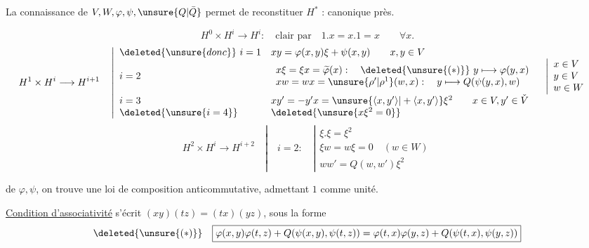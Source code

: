 La connaissance de $V,W,\varphi,\psi,\unsure{Q|\bar Q}$ permet de reconstituer $H^*$ :
 canonique près.

\[
H^0\times H^i\longrightarrow H^i:\quad\text{clair par}\quad
1.x=x.1=x\qquad\forall x.
\]
\[
H^1\times H^i\longrightarrow H^{i+1}\quad
\left|\begin{array}{ll}
\deleted{\unsure{donc}}\ i=1&xy=\varphi(x,y)\xi+\psi(x,y)\qquad x,y\in V\\
i=2&\begin{array}{l}
x\xi=\xi x=\widetilde\varphi(x):\quad\deleted{\unsure{(*)}}\ y\longmapsto\varphi(y,x)\\
xw=wx=\unsure{\rho'|\rho^1}(w,x):\quad y\longmapsto Q(\psi(y,x),w)
\end{array}\quad\left|\begin{array}{l}x\in V\\y\in V\\w\in W\end{array}\right.\\
i=3&xy'=-y'x=\unsure{\langle x,y'\rangle|+\langle x,y'\rangle}\xi^2\qquad x\in V,y'\in\check V\\
\deleted{\unsure{i=4}}&\deleted{\unsure{x\xi^2=0}}
\end{array}\right.
\]
\[
H^2\times H^i\longrightarrow H^{i+2}\quad
\left|\quad i=2:\quad\left|\begin{array}{l}
\xi.\xi=\xi^2\\
\xi w=w\xi=0\quad(w\in W)\\
ww'=Q(w,w')\xi^2
\end{array}\right.\right.
\]

 de $\varphi,\psi$, on trouve une loi de composition
anticommutative, admettant $1$ comme unité.

\uline{Condition d'associativité} s'écrit $(xy)(tz)=(tx)(yz)$, sous la forme
\[
\deleted{\unsure{(*)}}\quad
\boxed{\varphi(x,y)\varphi(t,z)+Q(\psi(x,y),\psi(t,z))
=\varphi(t,x)\varphi(y,z)+Q(\psi(t,x),\psi(y,z))}
\]

